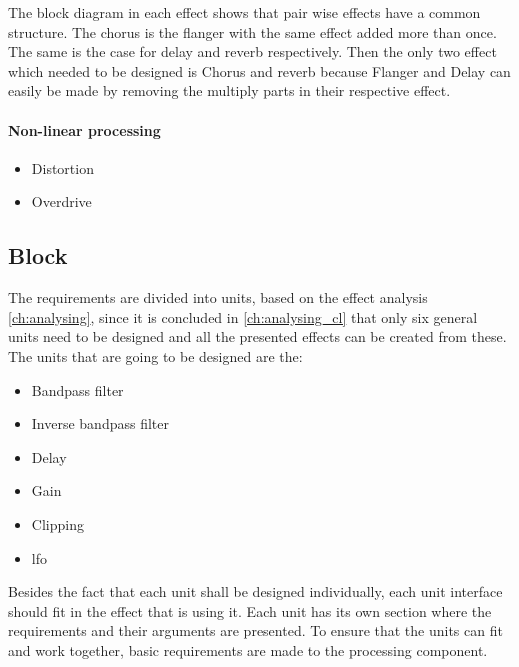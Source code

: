 The block diagram in each effect shows that pair wise effects have a common structure. The chorus is the flanger with the same effect added more than once. The same is the case for delay and \gls{reverb} respectively. Then the only two effect which needed to be designed is Chorus and \gls{reverb} because Flanger and Delay can easily be made by removing the multiply parts in their respective effect.

\paragraph{Non-linear processing}
\begin{itemize}
	\item Distortion
	\item Overdrive
\end{itemize} 

\subsection{Block}

The requirements are divided into units, based on the effect analysis \autoref{ch:analysing}, since it is concluded in \autoref{ch:analysing_cl} that only six general units need to be designed and all the presented effects can be created from these. The units that are going to be designed are the:



\begin{itemize}
	\item Bandpass filter
	\item Inverse bandpass filter
	\item Delay
	\item Gain
	\item Clipping
	\item \gls{lfo}
\end{itemize} 

 Besides the fact that each unit shall be designed individually, each unit interface should fit in the effect that is using it. Each unit has its own section where the requirements and their arguments are presented. To ensure that the units can fit and work together, basic requirements  are made to the processing component.
 
 
